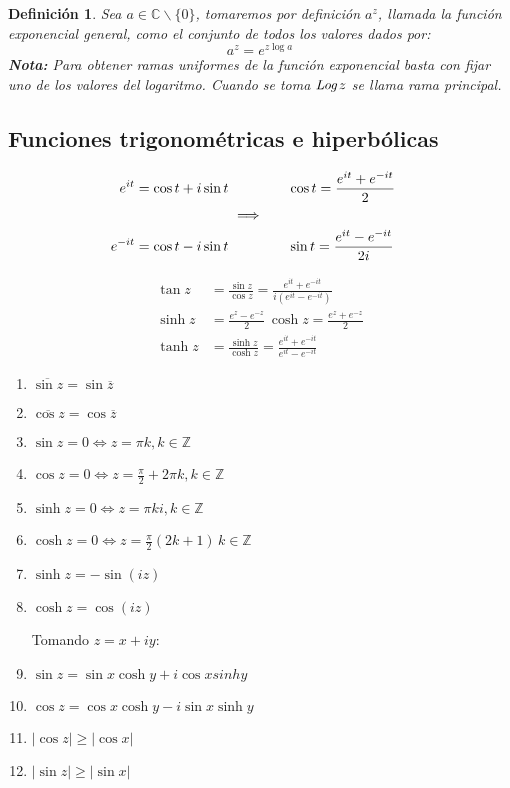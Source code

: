 \documentclass[12pt]{book}
\newtheorem{defi}{Definición}[chapter]
\newcommand{\C}{\mathbb{C}}
\newcommand{\Z}{\mathbb{Z}}
\newcommand{\Log}{\emph{Log}\hspace{0.5mm}}
\begin{document}
\begin{defi}
Sea $a \in\C\backslash\{0\}$, tomaremos por definición $a^z$, llamada la función exponencial general, como el conjunto de todos los valores dados por:
$$a^z = e^{z\log a}$$
\textbf{Nota:} Para obtener ramas uniformes de la función exponencial basta con fijar uno de los valores del logaritmo. Cuando se toma $\Log z$ se llama rama principal.
\end{defi}

\subsection{Funciones trigonométricas e hiperbólicas}
\begin{align*}
e^{it} = \cos t + i\sin t &  \hspace{1.5cm} \cos t = \frac{e^{it}+e^{-it}}{2} \\
&\ \Longrightarrow&  \\
e^{-it} = \cos t - i\sin t & \hspace{1.5cm}  \sin t = \frac{e^{it}-e^{-it}}{2i}
\end{align*}

\begin{align*}
\tan z &= \frac{\sin z}{\cos z} = \frac{e^{it}+e^{-it}}{i(e^{it}-e^{-it})}\\
\sinh z &= \frac{e^{z}-e^{-z}}{2} \  \cosh z = \frac{e^{z}+e^{-z}}{2} \\
\tanh z &= \frac{\sinh z}{\cosh z} = \frac{e^{it}+e^{-it}}{e^{it}-e^{-it}}
\end{align*}


\begin{enumerate}
\item $\overline{\sin z} = \sin \overline{z}$
\item $\overline{\cos z} = \cos \overline{z}$
\item $\sin z = 0 \Leftrightarrow z = \pi k, k \in\Z$
\item $\cos z = 0 \Leftrightarrow z = \frac{\pi}{2}+2\pi k, k\in\Z$
\item $\sinh z = 0 \Leftrightarrow z = \pi ki, k \in\Z$
\item $\cosh z = 0 \Leftrightarrow z = \frac{\pi}{2}(2k+1)\, k\in\Z$
\item $\sinh z = -\sin(iz)$
\item $\cosh z = \cos(iz)$

Tomando $z = x+iy$:
\item $\sin z = \sin x\cosh y + i\cos x sinh y$
\item $\cos z = \cos x\cosh y -i\sin x \sinh y$
\item $|\cos z|\geq |\cos x|$
\item $|\sin z|\geq |\sin x|$
\end{enumerate}
\end{document}
